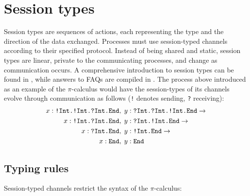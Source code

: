 \documentclass{mproj}
\newcommand{\picalc}{$\pi$-calculus}
\newcommand{\type}{\texttt}
\newcommand{\End}{\type{End}}
\newcommand{\Send}[1]{!#1.}
\newcommand{\Recv}[1]{?#1.}
\newcommand{\reduce}{\rightarrow}
\begin{document}
\section{Session types}\label{session-types}


Session types \cite{Honda1993, Takeuchi1994, Honda1998} are sequences of actions, each representing the type and the direction of the data exchanged.  Processes must use session-typed channels according to their specified protocol.  Instead of being shared and static, session types are linear, private to the communicating processes, and change as communication occurs. A comprehensive introduction to session types can be found in \cite{Vasconcelos2009}, while answers to FAQs are compiled in \cite{Dezani-ciancaglini2010}. The process above introduced as an example of the \picalc{} would have the session-types of its channels evolve through communication as follows (\type{!} denotes sending, \type{?} receiving):
\begin{align*}
x : \type{\Send{Int}\Send{Int}\Recv{Int}\End} &,\;
y : \type{\Recv{Int}\Recv{Int}\Send{Int}\End}
\reduce
\\
x : \type{\Send{Int}\Recv{Int}\End} &,\;
y : \type{\Recv{Int}\Send{Int}\End}
\reduce
\\
x : \type{\Recv{Int}\End} &,\;
y : \type{\Send{Int}\End}
\reduce
\\
x : \type{\End} &,\;
y : \type{\End}
\end{align*}

\subsection{Typing rules}

Session-typed channels restrict the syntax of the \picalc{}:
\end{document}
